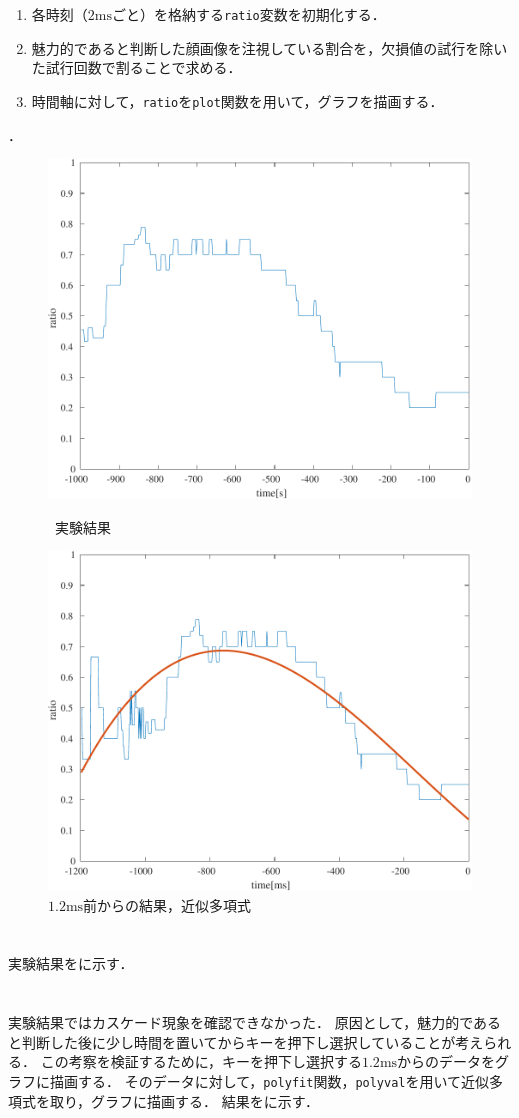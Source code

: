 \begin{enumerate}
\begin{enumerate}
              \item 最終的に魅力的であると判断した顔画像を注視している場合は\texttt{1}，そうでない場合は\texttt{0}を\expos の4列目に代入する．この処理は，画面状態が\texttt{0}と欠損値に対しては行わない．
              \item {}で初期化済みの\texttt{mergeC}行列に対して，に\expos の\(1\)から\(500\)行目（判断前1秒間）のデータを格納する．
          \end{enumerate}
    \item 各時刻（\(2\textrm{ms}\)ごと）を格納する\texttt{ratio}変数を初期化する．
    \item 魅力的であると判断した顔画像を注視している割合を，欠損値の試行を除いた試行回数で割ることで求める．
    \item 時間軸に対して，\texttt{ratio}を\texttt{plot}関数を用いて，グラフを描画する．
\end{enumerate}
\scall{\kadaia}．

\begin{figure}
    \centering
    \includegraphics[keepaspectratio,width=.4\textwidth]{../../Figures/12_01_graph.pdf}
    \caption{\kadaia\ 実験結果}
    \label{fig:\kadaia 実験結果}
    \includegraphics[keepaspectratio,width=.4\textwidth]{../../Figures/12_02_graph.pdf}
    \caption{\(1.2\textrm{ms}\)前からの結果，近似多項式}
    \label{fig:\kadaia 実験結果2}
\end{figure}
\section{\result}
実験結果をに示す．
\section{\consideration}
実験結果ではカスケード現象を確認できなかった．
原因として，魅力的であると判断した後に少し時間を置いてからキーを押下し選択していることが考えられる．
この考察を検証するために，キーを押下し選択する\(1.2\textrm{ms}\)からのデータをグラフに描画する．
そのデータに対して，\texttt{polyfit}関数，\texttt{polyval}を用いて近似多項式を取り，グラフに描画する．
結果をに示す．
